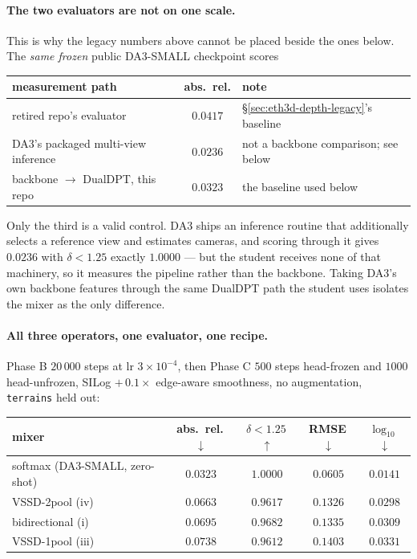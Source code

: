 \documentclass[11pt,a4paper]{article}
\begin{document}
\paragraph{The two evaluators are not on one scale.} This is why the legacy numbers above cannot
be placed beside the ones below. The \emph{same frozen} public DA3-SMALL checkpoint scores
\begin{center}\small
\begin{tabular}{lcl}
\toprule
measurement path & abs.\ rel. & note \\
\midrule
retired repo's evaluator          & $0.0417$ & \S\ref{sec:eth3d-depth-legacy}'s baseline \\
DA3's packaged multi-view inference & $0.0236$ & not a backbone comparison; see below \\
backbone $\to$ DualDPT, this repo  & $0.0323$ & the baseline used below \\
\bottomrule
\end{tabular}
\end{center}
\noindent Only the third is a valid control. DA3 ships an inference routine that additionally
selects a reference view and estimates cameras, and scoring through it gives $0.0236$ with
$\delta{<}1.25$ exactly $1.0000$ --- but the student receives none of that machinery, so it
measures the pipeline rather than the backbone. Taking DA3's own backbone features through the
same DualDPT path the student uses isolates the mixer as the only difference.

\paragraph{All three operators, one evaluator, one recipe.} Phase B $20\,000$ steps at
lr $3\times10^{-4}$, then Phase C $500$ steps head-frozen and $1000$ head-unfrozen, SILog
$+\,0.1\times$ edge-aware smoothness, no augmentation, \texttt{terrains} held out:
\begin{center}\small
\begin{tabular}{lcccc}
\toprule
mixer & abs.\ rel.\,$\downarrow$ & $\delta{<}1.25$\,$\uparrow$ & RMSE\,$\downarrow$ & $\log_{10}$\,$\downarrow$ \\
\midrule
softmax (DA3-SMALL, zero-shot)  & $\mathbf{0.0323}$ & $\mathbf{1.0000}$ & $\mathbf{0.0605}$ & $\mathbf{0.0141}$ \\
\midrule
VSSD-2pool (iv)        & $0.0663$ & $0.9617$ & $0.1326$ & $0.0298$ \\
bidirectional (i)               & $0.0695$ & $0.9682$ & $0.1335$ & $0.0309$ \\
VSSD-1pool (iii)             & $0.0738$ & $0.9612$ & $0.1403$ & $0.0331$ \\
\bottomrule
\end{tabular}
\end{center}
\end{document}
